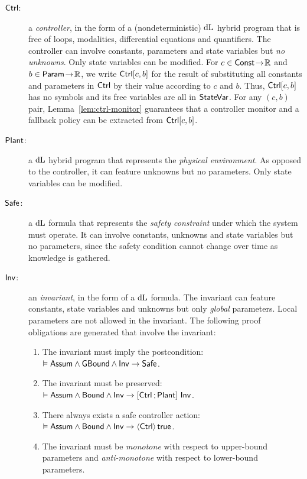 \documentclass[acmsmall,screen,nonacm]{acmart}
\begin{document}
\begin{description}
  \item[$\mathsf{Ctrl}$:] a \emph{controller}, in the form of a (nondeterministic) $\mathop{}\!\mathrm{d} \text{L}$ hybrid program that is free of loops, modalities, differential equations and quantifiers. The controller can involve constants, parameters and state variables but \emph{no unknowns}. Only state variables can be modified. For $c \in \mathsf{Const} \mathrel{\!\to\!} \mathbb{R}$ and $b \in \mathsf{Param} \mathrel{\!\to\!} \mathbb{R}$, we write $\mathsf{Ctrl}[c, b]$ for the result of substituting all constants and parameters in $\mathsf{Ctrl}$ by their value according to $c$ and $b$. Thus, $\mathsf{Ctrl}[c, b]$ has no symbols and its free variables are all in $\mathsf{StateVar}$. For any $(c, b)$ pair, Lemma~\ref{lem:ctrl-monitor} guarantees that a controller monitor and a fallback policy can be extracted from $\mathsf{Ctrl}[c, b]$.
  \item[$\mathsf{Plant}$:] a $\mathop{}\!\mathrm{d} \text{L}$ hybrid program that represents the \emph{physical environment}. As opposed to the controller, it can feature unknowns but no parameters. Only state variables can be modified.
  \item[$\mathsf{Safe}$:] a $\mathop{}\!\mathrm{d} \text{L}$ formula that represents the \emph{safety constraint} under which the system must operate. It can involve constants, unknowns and state variables but no parameters, since the safety condition cannot change over time as knowledge is gathered.
  \item[$\mathsf{Inv}$:] an \emph{invariant}, in the form of a $\mathop{}\!\mathrm{d} \text{L}$ formula. The invariant can feature constants, state variables and unknowns but only \emph{global} parameters. Local parameters are not allowed in the invariant. The following proof obligations are generated that involve the invariant:%
    \begin{enumerate}
      \item \label{obl:inv-implies-post} The invariant must imply the postcondition:
        $\vDash \mathsf{Assum} \wedge \mathsf{GBound} \wedge \mathsf{Inv} \rightarrow \mathsf{Safe}$.
      \item \label{obl:inv-preserved} The invariant must be preserved:
          $\vDash \mathsf{Assum} \wedge \mathsf{Bound} \wedge \mathsf{Inv} \rightarrow \left[\mathsf{Ctrl} \operatorname*{;} \mathsf{Plant}\right]\,\mathsf{Inv}$.
      \item \label{obl:ctrl-total} There always exists a safe controller action: $\vDash \mathsf{Assum} \wedge \mathsf{Bound} \wedge \mathsf{Inv} \rightarrow \langle\mathsf{Ctrl}\rangle\,\mathsf{true}$.
      \item \label{obl:inv-monotone} The invariant must be \emph{monotone} with respect to upper-bound parameters and \emph{anti-monotone} with respect to lower-bound parameters.
    \end{enumerate}

\end{description}
\end{document}
